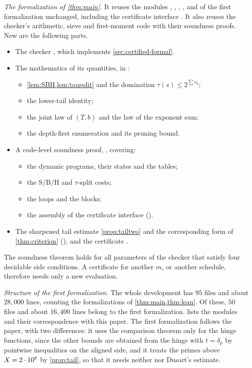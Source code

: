 \emph{The formalization of \cref{thm:main}.} It reuses the modules , ,
, ,  and  of the first formalization unchanged, including the
certificate interface . It also reuses the checker's arithmetic, sieve and first-moment code with their
soundness proofs. New are the following parts.
\begin{itemize}
\item The checker , which implements \cref{sec:certified-formal}.
\item The mathematics of its quantities, in :
  \begin{itemize}
  \item \cref{lem:SBH,lem:tausplit} and the domination $\tau(s)\le2^{\sum v_q}$;
  \item the lower-tail identity;
  \item the joint law of $(T,b)$ and the law of the exponent sum;
  \item the depth-first enumeration and its pruning bound.
  \end{itemize}
\item A code-level soundness proof, , covering:
  \begin{itemize}
  \item the dynamic programs, their states and the tables;
  \item the S/B/H and $\tau$-split costs;
  \item the loops and the blocks;
  \item the assembly of the certificate interface ().
  \end{itemize}
\item The sharpened tail estimate \cref{prop:tailtwo} and the corresponding form of \cref{thm:criterion}
  (), and the certificate .
\end{itemize}
The soundness theorem  holds for all parameters of the checker that satisfy four decidable side
conditions. A certificate for another $m$, or another schedule, therefore needs only a new 
evaluation.

\emph{Structure of the first formalization.} The whole development has $95$ files and about $28{,}000$ lines,
counting the formalizations of \cref{thm:main,thm:lean}. Of these, $50$ files and about $16{,}400$ lines belong to the
first formalization.  lists the modules and their correspondence with this paper. The first formalization
follows the paper, with two differences: it uses the
comparison theorem only for the hinge functions, since the other bounds are obtained from the hinge with
$t=\delta_p$ by pointwise inequalities on the aligned side, and it treats the primes above $X=2\cdot 10^{8}$ by
\cref{prop:tail}, so that it needs neither \cite[Theorem~6.1]{BBMST} nor Dusart's estimate.

